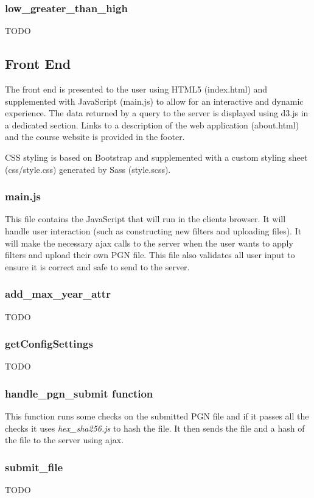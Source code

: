 \documentclass{article}
\begin{document}
\subsubsection*{low\_greater\_than\_high}
TODO


\subsection{Front End}

The front end is presented to the user using HTML5 (index.html) and supplemented with JavaScript (main.js) to allow for an interactive and dynamic experience.  The data returned by a query to the server is displayed using d3.js in a dedicated section.  Links to a description of the web application (about.html) and the course
website is provided in the footer.

CSS styling is based on Bootstrap and supplemented with a custom styling sheet (css/style.css) generated by Sass (style.scss).


\subsubsection{main.js}
This file contains the JavaScript that will run in the clients browser. It will handle user interaction (such as constructing new filters and uploading files). It will make the necessary ajax calls to the server when the user wants to apply filters and upload their own PGN file. This file also validates all user input to ensure it is correct and safe to send to the server.


\subsubsection*{add\_max\_year\_attr}
TODO


\subsubsection*{getConfigSettings}
TODO


\subsubsection*{handle\_pgn\_submit function}
This function runs some checks on the submitted PGN file and if it passes all the checks it uses \textit{hex\_sha256.js} to hash the file. It then sends the file and a hash of the file to the server using ajax.


\subsubsection*{submit\_file}
TODO
\end{document}
